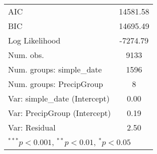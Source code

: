 \begin{table}[!h]
\begin{center}
\begin{tabular}{l c }
\hline
AIC                               & 14581.58      \\
BIC                               & 14695.49      \\
Log Likelihood                    & -7274.79      \\
Num. obs.                         & 9133          \\
Num. groups: simple\_date          & 1596          \\
Num. groups: PrecipGroup          & 8             \\
Var: simple\_date (Intercept)      & 0.00          \\
Var: PrecipGroup (Intercept)      & 0.19          \\
Var: Residual                     & 2.50          \\
\hline
\multicolumn{2}{l}{\scriptsize{$^{***}p<0.001$, $^{**}p<0.01$, $^*p<0.05$}}
\end{tabular}
\label{table:soil_moisture_model}
\end{center}
\end{table}
